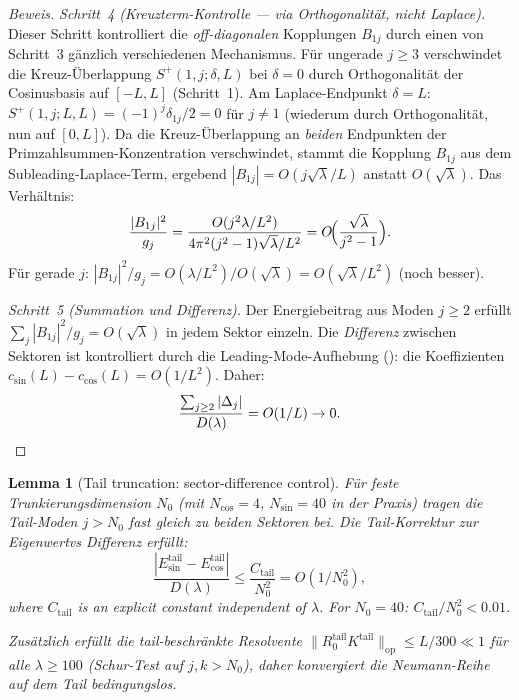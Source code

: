 ﻿\documentclass[12pt,a4paper]{article}
\newtheorem{lemma}[theorem]{Lemma}
\theoremstyle{definition}
\theoremstyle{remark}
\begin{document}
\begin{proof}[Beweis]
\emph{Schritt~4 (Kreuzterm-Kontrolle --- via Orthogonalität, nicht Laplace).} Dieser Schritt kontrolliert die \emph{off-diagonalen} Kopplungen $B_{1j}$ durch einen von Schritt~3 gänzlich verschiedenen Mechanismus. Für ungerade $j \geq 3$ verschwindet die Kreuz-Überlappung $S^+(1,j;\delta,L)$ bei $\delta = 0$ durch Orthogonalität der Cosinusbasis auf $[-L,L]$ (Schritt~1). Am Laplace-Endpunkt $\delta = L$: $S^+(1,j;L,L) = (-1)^j\delta_{1j}/2 = 0$ für $j \neq 1$ (wiederum durch Orthogonalität, nun auf $[0,L]$). Da die Kreuz-Überlappung an \emph{beiden} Endpunkten der Primzahlsummen-Konzentration verschwindet, stammt die Kopplung $B_{1j}$ aus dem Subleading-Laplace-Term, ergebend $|B_{1j}| = O(j\sqrt{\lambda}/L)$ anstatt $O(\sqrt{\lambda})$. Das Verhältnis:
\[
  \frac{|B_{1j}|^2}{g_j} = \frac{O(j^2\lambda/L^2)}{4\pi^2(j^2-1)\sqrt{\lambda}/L^2} = O\!\Bigl(\frac{\sqrt{\lambda}}{j^2-1}\Bigr).
\]
Für gerade $j$: $|B_{1j}|^2/g_j = O(\lambda/L^2)/O(\sqrt{\lambda}) = O(\sqrt{\lambda}/L^2)$ (noch besser).

\emph{Schritt~5 (Summation und Differenz).} Der Energiebeitrag aus Moden $j \geq 2$ erfüllt $\sum_j |B_{1j}|^2/g_j = O(\sqrt{\lambda})$ in jedem Sektor einzeln. Die \emph{Differenz} zwischen Sektoren ist kontrolliert durch die Leading-Mode-Aufhebung (): die Koeffizienten $c_{\sin}(L) - c_{\cos}(L) = O(1/L^2)$. Daher:
\[
  \frac{\sum_{j \geq 2}|\Delta_j|}{D(\lambda)} = O(1/L) \to 0. \qedhere
\]
\end{proof}

\begin{lemma}[Tail truncation: sector-difference control]
\label{lem:resolvent-truncation}
Für feste Trunkierungsdimension $N_0$ (mit $N_{\cos} = 4$, $N_{\sin} = 40$ in der Praxis) tragen die Tail-Moden $j > N_0$ fast gleich zu beiden Sektoren bei. Die Tail-Korrektur zur Eigenwertvs \emph{Differenz} erfüllt:
\begin{equation}
\label{eq:tail-diff}
  \frac{|E_{\sin}^{\mathrm{tail}} - E_{\cos}^{\mathrm{tail}}|}{D(\lambda)}
  \leq \frac{C_{\mathrm{tail}}}{N_0^2} = O(1/N_0^2),
\end{equation}
where $C_{\mathrm{tail}}$ is an explicit constant independent of $\lambda$. For $N_0 = 40$: $C_{\mathrm{tail}}/N_0^2 < 0.01$.

Zusätzlich erfüllt die tail-beschränkte Resolvente $\|R_0^{\mathrm{tail}} K^{\mathrm{tail}}\|_{\mathrm{op}} \leq L/300 \ll 1$ für alle $\lambda \geq 100$ (Schur-Test auf $j, k > N_0$), daher konvergiert die Neumann-Reihe auf dem Tail bedingungslos.
\end{lemma}
\end{document}
